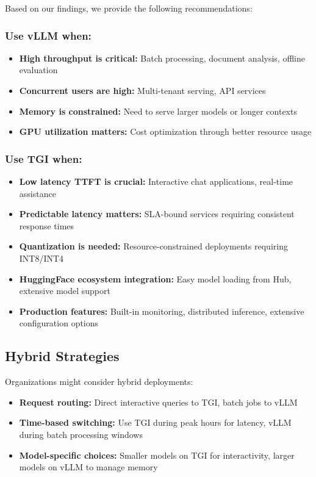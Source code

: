 \documentclass{article}
\begin{document}
Based on our findings, we provide the following recommendations:

\subsubsection{Use vLLM when:}

\begin{itemize}
    \item \textbf{High throughput is critical:} Batch processing, document analysis, offline evaluation
    \item \textbf{Concurrent users are high:} Multi-tenant serving, API services
    \item \textbf{Memory is constrained:} Need to serve larger models or longer contexts
    \item \textbf{GPU utilization matters:} Cost optimization through better resource usage
\end{itemize}

\subsubsection{Use TGI when:}

\begin{itemize}
    \item \textbf{Low latency TTFT is crucial:} Interactive chat applications, real-time assistance
    \item \textbf{Predictable latency matters:} SLA-bound services requiring consistent response times
    \item \textbf{Quantization is needed:} Resource-constrained deployments requiring INT8/INT4
    \item \textbf{HuggingFace ecosystem integration:} Easy model loading from Hub, extensive model support
    \item \textbf{Production features:} Built-in monitoring, distributed inference, extensive configuration options
\end{itemize}

\subsection{Hybrid Strategies}

Organizations might consider hybrid deployments:

\begin{itemize}
    \item \textbf{Request routing:} Direct interactive queries to TGI, batch jobs to vLLM
    \item \textbf{Time-based switching:} Use TGI during peak hours for latency, vLLM during batch processing windows
    \item \textbf{Model-specific choices:} Smaller models on TGI for interactivity, larger models on vLLM to manage memory
\end{itemize}
\end{document}
